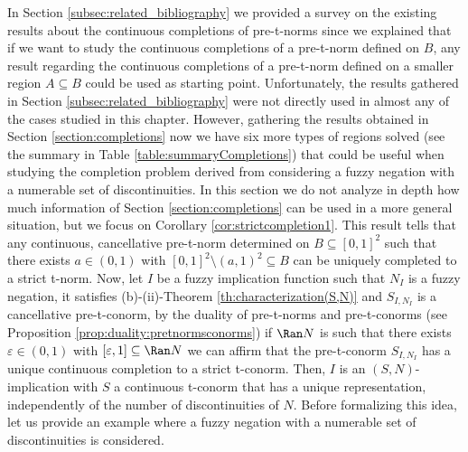 In Section \ref{subsec:related_bibliography} we provided a survey on the existing results about the continuous completions of pre-t-norms since we explained that if we want to study the continuous completions of a pre-t-norm defined on $B$, any result regarding the continuous completions of a pre-t-norm defined on a smaller region $A \subseteq B$ could be used as starting point. Unfortunately, the results gathered in Section \ref{subsec:related_bibliography} were not directly used in almost any of the cases studied in this chapter. However, gathering the results obtained in Section \ref{section:completions} now we have six more types of regions solved (see the summary in Table \ref{table:summaryCompletions}) that could be useful when studying the completion problem derived from considering a fuzzy negation with a numerable set of discontinuities. In this section we do not analyze in depth how much information of Section \ref{section:completions} can be used in a more general situation, but we focus on  Corollary \ref{cor:strictcompletion1}. This result tells that any continuous, cancellative pre-t-norm determined on $B\subseteq [0,1]^2$ such that there exists $a \in (0,1)$ with $[0,1]^2 \setminus (a,1)^2 \subseteq B$ can be uniquely completed to a strict t-norm. Now, let $I$ be a fuzzy implication function such that $N_I$ is a fuzzy negation, it satisfies (b)-(ii)-Theorem \ref{th:characterization(S,N)} and $S_{I,N_I}$ is a cancellative pre-t-conorm, by the duality of pre-t-norms and pre-t-conorms (see Proposition \ref{prop:duality:pretnormsconorms}) if $\Ran N$ is such that there exists $\varepsilon \in (0,1)$ with $[\varepsilon,1] \subseteq \Ran N$ we can affirm that the pre-t-conorm $S_{I,N_I}$ has a unique continuous completion to a strict t-conorm. Then, $I$ is an $(S,N)$-implication with $S$ a continuous t-conorm that has a unique representation, independently of the number of discontinuities of $N$. Before formalizing this idea, let us provide an example where a fuzzy negation with a numerable set of discontinuities is considered.

